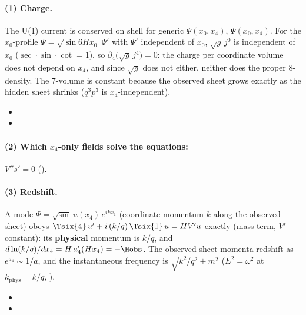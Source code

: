 \paragraph{(1) Charge.} The U(1) current is conserved on shell for generic $\Psi(x_0,x_4)$,
$\bar\Psi(x_0,x_4)$. For the $x_0$-profile $\Psi=\sqrt{\sin 6Hx_0}\;\Psi'$ with $\Psi'$ independent of
$x_0$, $\sqrt g\,j^0$ is independent of $x_0$ ($\sec\cdot\sin\cdot\cot=1$), so
$\partial_4\bigl(\sqrt g\,j^4\bigr)=0$: the charge per coordinate volume does not depend on $x_4$, and
since $\sqrt g$ does not either, neither does the proper 8-density. The 7-volume is constant because
the observed sheet grows exactly as the hidden sheet shrinks ($q^3p^3$ is $x_4$-independent).
\begin{itemize}
  \item {}
  \item {}
\end{itemize}

\paragraph{(2) Which $x_4$-only fields solve the equations:} $V''s'=0$ ().

\paragraph{(3) Redshift.} A mode $\Psi=\sqrt{\sin}\;u(x_4)\,e^{ikx_1}$ (coordinate momentum $k$ along
the observed sheet) obeys $\Tsix{4}\,u'+i\,(k/q)\,\Tsix{1}\,u=HV'u$ exactly (mass term, $V'$
constant): its \textbf{physical} momentum is $k/q$, and $d\ln(k/q)/dx_4=H\,a_4'(Hx_4)=-\Hobs$. The
observed-sheet momenta redshift as $e^{a_4}\sim1/a$, and the instantaneous frequency is
$\sqrt{k^2/q^2+m^2}$ ($E^2=\omega^2$ at $k_{\mathrm{phys}}=k/q$, ). 
\begin{itemize}
  \item {}
  \item {}
\end{itemize}

